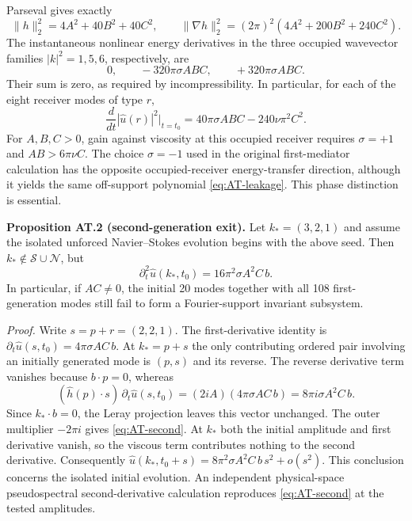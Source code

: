 Parseval gives exactly
\begin{equation}\label{eq:AT-energy}
 \|h\|_2^2=4A^2+40B^2+40C^2,\qquad
 \|\nabla h\|_2^2=(2\pi)^2(4A^2+200B^2+240C^2).
\end{equation}
The instantaneous nonlinear energy derivatives in the three
occupied wavevector families $|k|^2=1,5,6$, respectively, are
\[
 0,\qquad -320\pi\sigma ABC,\qquad
 +320\pi\sigma ABC.
\]
Their sum is zero, as required by incompressibility.
In particular, for each of the eight receiver modes of type $r$,
\[
 \frac{d}{dt}|\widehat u(r)|^2\Big|_{t=t_0}
   =40\pi\sigma ABC-240\nu\pi^2 C^2.
\]
For $A,B,C>0$, gain against viscosity at this occupied receiver
requires $\sigma=+1$ and $AB>6\pi\nu C$. The choice
$\sigma=-1$ used in the original first-mediator calculation
has the opposite occupied-receiver energy-transfer direction,
although it yields the same off-support polynomial
\eqref{eq:AT-leakage}. This phase distinction is essential.

\noindent\textbf{Proposition AT.2 (second-generation exit).}
Let $k_*=(3,2,1)$ and assume the isolated unforced
Navier--Stokes evolution begins with the above seed. Then
$k_*\notin\mathcal S\cup\mathcal N$, but
\begin{equation}\label{eq:AT-second}
 \partial_t^2\widehat u(k_*,t_0)
  =16\pi^2\sigma A^2C\,b .
\end{equation}
In particular, if $AC\ne0$, the initial 20 modes together
with all 108 first-generation modes still fail to form a
Fourier-support invariant subsystem.

\emph{Proof.}
Write $s=p+r=(2,2,1)$. The first-derivative identity is
$\partial_t\widehat u(s,t_0)=4\pi\sigma AC\,b$.
At $k_*=p+s$ the only contributing ordered
pair involving an initially generated mode is $(p,s)$ and
its reverse. The reverse derivative term vanishes because
$b\cdot p=0$, whereas
\[
 (\widehat h(p)\cdot s)\,\partial_t\widehat u(s,t_0)
 =(2iA)(4\pi\sigma AC\,b)
 =8\pi i\sigma A^2C\,b .
\]
Since $k_*\cdot b=0$, the Leray projection leaves
this vector unchanged. The outer multiplier $-2\pi i$
gives \eqref{eq:AT-second}. At $k_*$ both the initial
amplitude and first derivative vanish, so the viscous
term contributes nothing to the second derivative.
Consequently
$\widehat u(k_*,t_0+s)
=8\pi^2\sigma A^2C\,b\,s^2+o(s^2)$.
This conclusion concerns the isolated initial evolution.
An independent physical-space pseudospectral
second-derivative calculation reproduces
\eqref{eq:AT-second} at the tested amplitudes.

